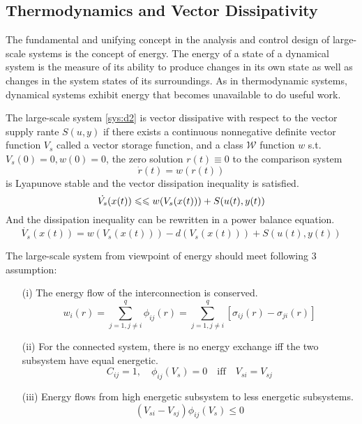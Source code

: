 \documentclass{paper}
\begin{document}
\subsection{Thermodynamics and Vector Dissipativity}
The fundamental and unifying concept in the analysis and control design of large-scale systems is the concept of energy. The energy
of a state of a dynamical system is the measure of its ability to produce changes in its own state as well as changes in the system 
states of its surroundings. As in thermodynamic systems, dynamical systems exhibit energy that becomes unavailable to do useful work. 
\begin{defi}
The large-scale system \ref{sys:d2} is vector dissipative with respect to the vector supply rante $S(u,y)$ if there exists a
continuous nonnegative definite vector function $V_s$ called a vector storage function, and a class $\mathcal{W}$ function $w$ s.t.
$V_s(0)=0,w(0)=0$, the zero solution $r(t)\equiv 0$ to the comparison system 
\begin{equation}
\dot{r}(t)=w(r(t))
\end{equation}
is Lyapunove stable and the vector dissipation inequality is satisfied.
\begin{equation}
\dot{V_s}(x(t))\leqslant\leqslant w(V_s(x(t)))+S(u(t),y(t))
\end{equation}
And the dissipation inequality can be rewritten in a power balance equation.
\begin{equation}
\dot{V_s}(x(t))= w(V_s(x(t)))-d(V_s(x(t)))+S(u(t),y(t))
\end{equation}
\end{defi}
\begin{assume}\label{assume:1}
The large-scale system from viewpoint of energy should meet following 3 assumption:
\begin{enumerate}
\item[(i)] The energy flow of the interconnection is conserved.
\begin{equation}
w_i(r)=\sum\limits_{j=1,j\neq i}^{q}\phi_{ij}(r)=\sum\limits_{j=1,j\neq i}^{q}[\sigma_{ij}(r)-\sigma_{ji}(r)]
\end{equation}
\item[(ii)] For the connected system, there is no energy exchange iff the two subsystem have equal energetic.
\begin{equation}
C_{ij}=1,\quad\phi_{ij}(V_s)=0\quad\text{iff}\quad V_{si}=V_{sj}
\end{equation}
\item[(iii)] Energy flows from high energetic subsystem to less energetic subsystems.
\begin{equation}
(V_{si}-V_{sj})\phi_{ij}(V_s)\leqslant 0
\end{equation}
\end{enumerate}
\end{assume}
\end{document}
